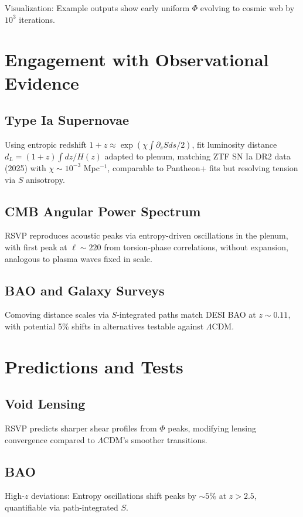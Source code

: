 \documentclass[11pt]{article}
\theoremstyle{plain}
\theoremstyle{definition}
\begin{document}
Visualization: Example outputs show early uniform $\Phi$ evolving to cosmic web by $10^3$ iterations.

\section{Engagement with Observational Evidence}
\subsection{Type Ia Supernovae}
Using entropic redshift $1+z \approx \exp(\chi \int \partial_s S ds / 2)$, fit luminosity distance $d_L = (1+z) \int dz / H(z)$ adapted to plenum, matching ZTF SN Ia DR2 data (2025) with $\chi \sim 10^{-3}$ Mpc$^{-1}$, comparable to Pantheon+ fits but resolving tension via $S$ anisotropy.

\subsection{CMB Angular Power Spectrum}
RSVP reproduces acoustic peaks via entropy-driven oscillations in the plenum, with first peak at $\ell \sim 220$ from torsion-phase correlations, without expansion, analogous to plasma waves fixed in scale.

\subsection{BAO and Galaxy Surveys}
Comoving distance scales via $S$-integrated paths match DESI BAO at $z\sim0.11$, with potential 5\% shifts in alternatives testable against $\Lambda$CDM.

\section{Predictions and Tests}
\subsection{Void Lensing}
RSVP predicts sharper shear profiles from $\Phi$ peaks, modifying lensing convergence compared to $\Lambda$CDM's smoother transitions.

\subsection{BAO}
High-$z$ deviations: Entropy oscillations shift peaks by $\sim5\%$ at $z>2.5$, quantifiable via path-integrated $S$.
\end{document}
